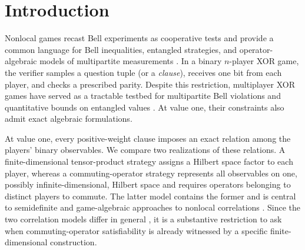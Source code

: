 \documentclass[11pt]{article}
\theoremstyle{definition}
\theoremstyle{remark}
\numberwithin{equation}{section}
\begin{document}
\newpage
\setcounter{tocdepth}{2}
\tableofcontents

\section{Introduction}\label{sec:introduction}

Nonlocal games recast Bell experiments as cooperative tests and provide a
common language for Bell inequalities, entangled strategies, and
operator-algebraic models of multipartite measurements
\cite{Bell1964,ClauserHorneShimonyHolt1969,
CleveHoyerTonerWatrous2004}.  In a binary \(n\)-player XOR game, the verifier
samples a question tuple (or a \emph{clause}), receives one bit from each player, and checks a
prescribed parity.  
Despite this
restriction, multiplayer XOR games have served as a tractable testbed for
multipartite Bell violations and quantitative bounds on entangled values
\cite{PerezGarciaEtAl2008,BrietVidick2013}. At value one, their constraints also
admit exact algebraic formulations.

At value one, every positive-weight clause imposes an exact relation among
the players' binary observables.  We compare two realizations of these
relations.  A finite-dimensional tensor-product strategy assigns a Hilbert
space factor to each player, whereas a commuting-operator strategy represents
all observables on one, possibly infinite-dimensional, Hilbert space and
requires operators belonging to distinct players to commute.  The latter
model contains the former and is central to semidefinite and game-algebraic
approaches to nonlocal correlations
\cite{NavascuesPironioAcin2008,CleveLiuSlofstra2017}.  Since the two correlation
models differ in general \cite{Slofstra2019,JiNatarajanVidickWrightYuen2020}, it
is a substantive restriction to ask when commuting-operator satisfiability is
already witnessed by a specific finite-dimensional construction.
\end{document}

